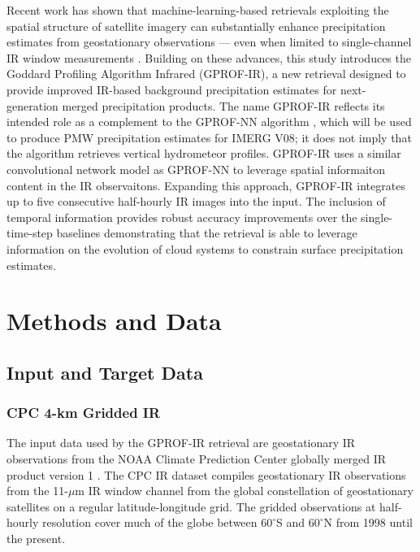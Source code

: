 \documentclass{ametsocV6.1}
\begin{document}
Recent work has shown that machine-learning-based retrievals exploiting the
spatial structure of satellite imagery can substantially enhance precipitation
estimates from geostationary observations \citep{amell_probabilistic_2025} ---
even when limited to single-channel IR window measurements
\citep{pfreundschuh_improved_2022}. Building on these advances, this study
introduces the Goddard Profiling Algorithm Infrared (GPROF-IR), a new retrieval
designed to provide improved IR-based background precipitation estimates for
next-generation merged precipitation products. The name GPROF-IR reflects its
intended role as a complement to the GPROF-NN algorithm
\citep{pfreundschuh_gprof-nn_2022}, which will be used to produce PMW
precipitation estimates for IMERG V08; it does not imply that the algorithm
retrieves vertical hydrometeor profiles. GPROF-IR uses a similar convolutional
network model as GPROF-NN to leverage spatial informaiton content in the IR
observaitons. Expanding this approach, GPROF-IR  integrates up to five consecutive
half-hourly IR images into the input. The inclusion of temporal information provides robust accuracy
improvements over the single-time-step baselines demonstrating that the retrieval is
able to leverage information on the evolution of cloud systems to constrain
surface precipitation estimates.



\section{Methods and Data}
\label{sec:methods}

\subsection{Input and Target Data}

\subsubsection{CPC 4-km Gridded IR}

The input data used by the GPROF-IR retrieval are geostationary IR observations
from the NOAA Climate Prediction Center globally merged IR product version 1
\citep{ncep_cpc_gpm_mergir_v1, janowiak2001real}. The CPC IR dataset compiles
geostationary IR observations from the 11-$\mu$m IR window channel from the
global constellation of geostationary satellites on a regular latitude-longitude
grid. The gridded observations at half-hourly resolution cover much
of the globe between $60^\circ$S and $60^\circ$N from 1998 until the present.
\end{document}
